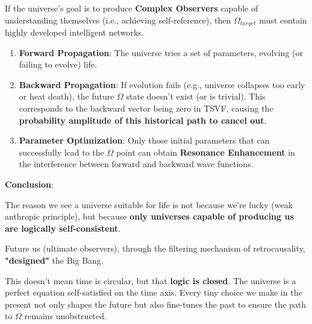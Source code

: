 If the universe's goal is to produce \textbf{Complex Observers} capable of understanding themselves (i.e., achieving self-reference), then $\Omega_{target}$ must contain highly developed intelligent networks.

\begin{enumerate}
\item \textbf{Forward Propagation}: The universe tries a set of parameters, evolving (or failing to evolve) life.

\item \textbf{Backward Propagation}: If evolution fails (e.g., universe collapses too early or heat death), the future $\Omega$ state doesn't exist (or is trivial). This corresponds to the backward vector being zero in TSVF, causing the \textbf{probability amplitude of this historical path to cancel out}.

\item \textbf{Parameter Optimization}: Only those initial parameters that can successfully lead to the $\Omega$ point can obtain \textbf{Resonance Enhancement} in the interference between forward and backward wave functions.
\end{enumerate}

\textbf{Conclusion}:

The reason we see a universe suitable for life is not because we're lucky (weak anthropic principle), but because \textbf{only universes capable of producing us are logically self-consistent}.

Future us (ultimate observers), through the filtering mechanism of retrocausality, \textbf{"designed"} the Big Bang.

This doesn't mean time is circular, but that \textbf{logic is closed}. The universe is a perfect equation self-satisfied on the time axis. Every tiny choice we make in the present not only shapes the future but also fine-tunes the past to ensure the path to $\Omega$ remains unobstructed.
